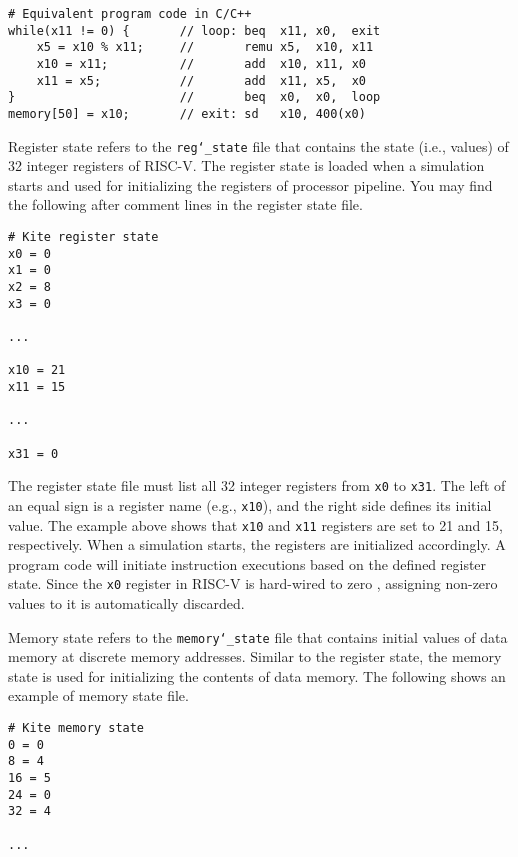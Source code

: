 \documentclass[10pt]{article}
\begin{document}
\begin{Verbatim}[frame=single,fontsize=\small]
# Equivalent program code in C/C++
while(x11 != 0) {       // loop: beq  x11, x0,  exit
    x5 = x10 % x11;     //       remu x5,  x10, x11
    x10 = x11;          //       add  x10, x11, x0
    x11 = x5;           //       add  x11, x5,  x0
}                       //       beq  x0,  x0,  loop
memory[50] = x10;       // exit: sd   x10, 400(x0)
\end{Verbatim}

Register state refers to the {\tt reg\char`_state} file that contains the state (i.e., values) of 32 integer registers of RISC-V.
The register state is loaded when a simulation starts and used for initializing the registers of processor pipeline.
You may find the following after comment lines in the register state file.

\begin{Verbatim}[frame=single,fontsize=\small]
# Kite register state
x0 = 0
x1 = 0
x2 = 8
x3 = 0

...

x10 = 21
x11 = 15

...

x31 = 0
\end{Verbatim}

The register state file must list all 32 integer registers from {\tt x0} to {\tt x31}.
The left of an equal sign is a register name (e.g., {\tt x10}), and the right side defines its initial value.
The example above shows that {\tt x10} and {\tt x11} registers are set to 21 and 15, respectively.
When a simulation starts, the registers are initialized accordingly.
A program code will initiate instruction executions based on the defined register state.
Since the {\tt x0} register in RISC-V is hard-wired to zero \cite{patterson_morgan2017}, assigning non-zero values to it is automatically discarded.

Memory state refers to the {\tt memory\char`_state} file that contains initial values of data memory at discrete memory addresses.
Similar to the register state, the memory state is used for initializing the contents of data memory.
The following shows an example of memory state file.

\begin{Verbatim}[frame=single,fontsize=\small]
# Kite memory state
0 = 0
8 = 4
16 = 5
24 = 0
32 = 4

...

\end{Verbatim}
\end{document}
